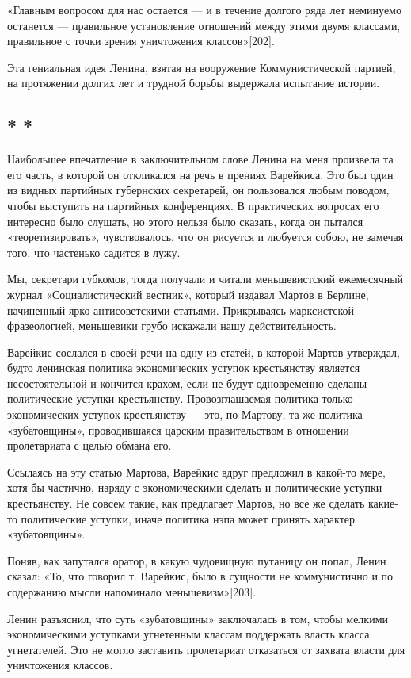 \documentclass[12pt, a4paper, openany]{book}
\begin{document}
«Главным вопросом для нас остается — и в течение долгого ряда лет неминуемо останется — правильное установление отношений между этими двумя классами, правильное с точки зрения уничтожения классов»[202].

Эта гениальная идея Ленина, взятая на вооружение Коммунистической партией, на протяжении долгих лет и трудной борьбы выдержала испытание истории.

\subsection*{\center * * *}

Наибольшее впечатление в заключительном слове Ленина на меня произвела та его часть, в которой он откликался на речь в прениях Варейкиса. Это был один из видных партийных губернских секретарей, он пользовался любым поводом, чтобы выступить на партийных конференциях. В практических вопросах его интересно было слушать, но этого нельзя было сказать, когда он пытался «теоретизировать», чувствовалось, что он рисуется и любуется собою, не замечая того, что частенько садится в лужу.

Мы, секретари губкомов, тогда получали и читали меньшевистский ежемесячный журнал «Социалистический вестник», который издавал Мартов в Берлине, начиненный ярко антисоветскими статьями. Прикрываясь марксистской фразеологией, меньшевики грубо искажали нашу действительность.

Варейкис сослался в своей речи на одну из статей, в которой Мартов утверждал, будто ленинская политика экономических уступок крестьянству является несостоятельной и кончится крахом, если не будут одновременно сделаны политические уступки крестьянству. Провозглашаемая политика только экономических уступок крестьянству — это, по Мартову, та же политика «зубатовщины», проводившаяся царским правительством в отношении пролетариата с целью обмана его.

Ссылаясь на эту статью Мартова, Варейкис вдруг предложил в какой-то мере, хотя бы частично, наряду с экономическими сделать и политические уступки крестьянству. Не совсем такие, как предлагает Мартов, но все же сделать какие-то политические уступки, иначе политика нэпа может принять характер «зубатовщины».

Поняв, как запутался оратор, в какую чудовищную путаницу он попал, Ленин сказал: «То, что говорил т. Варейкис, было в сущности не коммунистично и по содержанию мысли напоминало меньшевизм»[203].

Ленин разъяснил, что суть «зубатовщины» заключалась в том, чтобы мелкими экономическими уступками угнетенным классам поддержать власть класса угнетателей. Это не могло заставить пролетариат отказаться от захвата власти для уничтожения классов.
\end{document}
